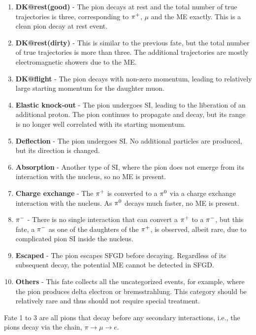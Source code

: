           \begin{enumerate}
               \item \textbf{DK@rest(good)} - The pion decays at rest and the total number of true trajectories is three, corresponding to $\pi^+$, $\mu$ and the ME exactly. 
               This is a clean pion decay at rest event. 
               \item \textbf{DK@rest(dirty)} - This is similar to the previous fate, but the total number of true trajectories is more than three.
               The additional trajectories are mostly electromagnetic showers due to the ME. 
               \item \textbf{DK@flight} - The pion decays with non-zero momentum, leading to relatively large starting momentum for the daughter muon.
               \item \textbf{Elastic knock-out} - The pion undergoes SI, leading to the liberation of an additional proton.
               The pion continues to propagate and decay, but its range is no longer well correlated with its starting momentum.
               \item \textbf{Deflection} - The pion undergoes SI. 
               No additional particles are produced, but its direction is changed.
               \item \textbf{Absorption} - Another type of SI, where the pion does not emerge from its interaction with the nucleus, so no ME is present.
               \item \textbf{Charge exchange} - The $\pi^+$ is converted to a $\pi^0$ via a charge exchange interaction with the nucleus.
               As $\pi^0$ decays much faster, no ME is present.
               \item \textbf{$\pi^-$} - There is no single interaction that can convert a $\pi^+$ to a $\pi^-$, but this fate, a $\pi^-$ as one of the daughters of the $\pi^+$, is observed, albeit rare, due to complicated pion SI inside the nucleus.
               \item \textbf{Escaped} - The pion escapes SFGD before decaying.
               Regardless of its subsequent decay, the potential ME cannot be detected in SFGD.
               \item \textbf{Others} - This fate collects all the uncategorized events, for example, where the pion produces delta electron or bremsstrahlung.
               This category should be relatively rare and thus should not require special treatment.
          \end{enumerate}
          Fate 1 to 3 are all pions that decay before any secondary interactions, i.e., the pions decay via the chain, $\pi \rightarrow \mu \rightarrow e$.

